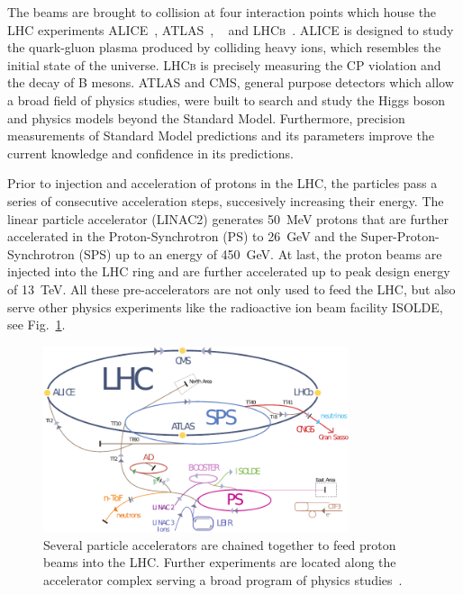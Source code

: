 The beams are brought to collision at four interaction points which house the
LHC experiments ALICE~\cite{ALICE}, ATLAS~\cite{ATLASa},
\CMS~\cite{Bayatian:922757,Ball:2007zza,Chatrchyan:2008aa} and
\textsc{LHCb}~\cite{LHCb}. ALICE is designed to study the quark-gluon plasma
produced by colliding heavy ions, which resembles the initial state of the
universe. \textsc{LHCb} is precisely measuring the CP violation and the decay of B
mesons. ATLAS and CMS, general purpose detectors which allow a broad field of
physics studies, were built to search and study the Higgs boson and physics
models beyond the Standard Model. Furthermore, precision measurements of
Standard Model predictions and its parameters improve the current knowledge and
confidence in its predictions.

Prior to injection and acceleration of protons in the LHC, the particles pass a
series of consecutive acceleration steps, succesively increasing their energy.
The linear particle accelerator (LINAC2) generates \SI{50}{\mega \electronvolt}
protons that are further accelerated in the Proton-Synchrotron (PS) to
\SI{26}{\giga \electronvolt} and the Super-Proton-Synchrotron (SPS) up to an
energy of \SI{450}{\giga \electronvolt}. At last, the proton beams are injected
into the LHC ring and are further accelerated up to peak design energy of
\SI{13}{\tera\electronvolt}. All these pre-accelerators are not only used to
feed the LHC, but also serve other physics experiments like the radioactive ion
beam facility ISOLDE, see Fig.~\ref{fig:lhc_complex}.

\begin{figure}[htbp]
    \centering
    \includegraphics[width=0.8\textwidth]{figures/cms_detector/lhc_accelerator_chain.pdf}
    \caption[\CERN accelerator complex]{Several particle accelerators are
        chained together to feed proton beams into the LHC. Further experiments are
        located along the accelerator complex serving a broad program of physics
        studies~\cite{LHC:COMPLEX}.}
    \label{fig:lhc_complex}
\end{figure}

